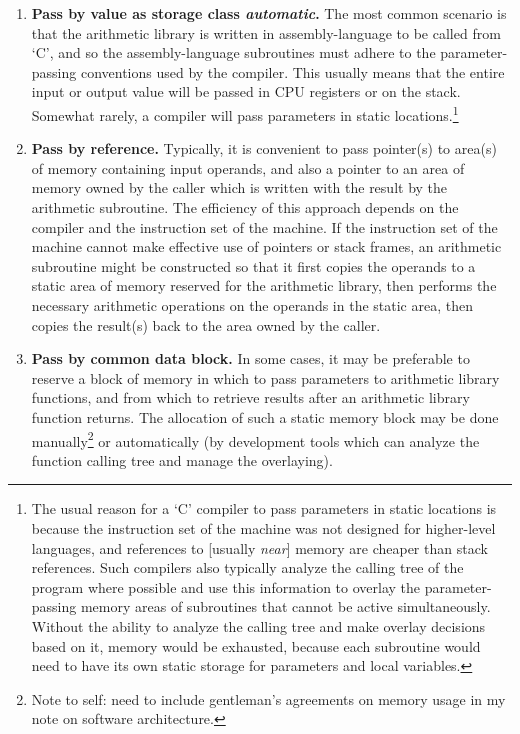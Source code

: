\begin{enumerate}
\item \textbf{Pass by value as storage class \emph{automatic}.}
      The most common scenario is that the arithmetic
      library is written in assembly-language to be called from
      `C', and so the assembly-language subroutines must adhere to the
      parameter-passing conventions used by the compiler.
      This usually means that the entire input or output value
      will be passed in CPU registers or on the stack.  Somewhat rarely, 
      a compiler will pass parameters in static locations.\footnote{The
      usual reason for a `C' compiler to pass parameters in static locations
      is because the instruction set of the machine was not designed for
      higher-level languages, and references to [usually \emph{near}] memory
      are cheaper than stack references.  Such compilers also typically 
      analyze the calling tree of the program where possible and use this
      information to overlay the parameter-passing memory areas of 
      subroutines that cannot be active simultaneously.  Without the ability
      to analyze the calling tree and make overlay decisions based on it,
      memory would be exhausted, because each subroutine would need to have its
      own static storage for parameters and local variables.}
\item \textbf{Pass by reference.}
      Typically, it is convenient to pass pointer(s) to area(s) of memory
      containing input operands, and also a pointer to an area of memory
      owned by the caller which is written with the result by the arithmetic subroutine.
      The efficiency of this approach depends on the compiler and the instruction
      set of the machine.  If the instruction set of the machine cannot 
      make effective use of pointers or stack frames, an arithmetic subroutine
      might be constructed so that it first copies the operands to a static area of memory
      reserved for the arithmetic library, then performs the necessary arithmetic
      operations on the operands in the static area, 
      then copies the result(s) back to the area owned by the caller.
\item \textbf{Pass by common data block.}
      In some cases, it may be preferable to reserve a block of memory in which to
      pass parameters to arithmetic library functions, and from which to retrieve
      results after an arithmetic library function returns.  The allocation of such
      a static memory block may be done manually\footnote{Note to self:  need to
      include gentleman's agreements on memory usage in my note on software architecture.}
      or automatically (by development tools which can analyze the function calling tree and
      manage the overlaying).
\end{enumerate}



